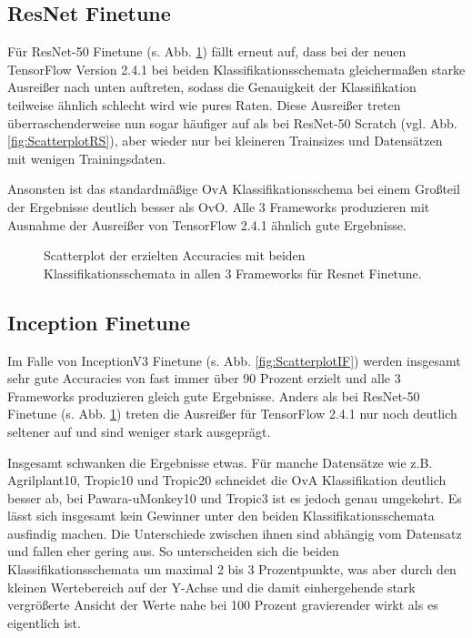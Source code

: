 \subsection{ResNet Finetune}
Für ResNet-50 Finetune (s. Abb. \ref{fig:ScatterplotRF}) fällt erneut auf, dass bei der neuen TensorFlow \cite{tensorflow} Version 2.4.1 bei beiden Klassifikationsschemata gleichermaßen starke Ausreißer nach unten auftreten, sodass die Genauigkeit der Klassifikation teilweise ähnlich schlecht wird wie pures Raten. Diese Ausreißer treten überraschenderweise nun sogar häufiger auf als bei ResNet-50 Scratch (vgl. Abb. \ref{fig:ScatterplotRS}), aber wieder nur bei kleineren Trainsizes und Datensätzen mit wenigen Trainingsdaten.

Ansonsten ist das standardmäßige OvA Klassifikationsschema bei einem Großteil der Ergebnisse deutlich besser als OvO. Alle 3 Frameworks produzieren mit Ausnahme der Ausreißer von TensorFlow \cite{tensorflow} 2.4.1 ähnlich gute Ergebnisse.
\begin{figure}[H]
\begin{adjustbox}{width=\textwidth, center}

\end{adjustbox}
\caption{Scatterplot der erzielten Accuracies mit beiden Klassifikationsschemata in allen 3 Frameworks für Resnet Finetune.}
\label{fig:ScatterplotRF}
\end{figure}
\newpage
\subsection{Inception Finetune}
Im Falle von InceptionV3 Finetune (s. Abb. \ref{fig:ScatterplotIF}) werden insgesamt sehr gute Accuracies von fast immer über 90 Prozent erzielt und alle 3 Frameworks produzieren gleich gute Ergebnisse. Anders als bei ResNet-50 Finetune (s. Abb. \ref{fig:ScatterplotRF}) treten die Ausreißer für TensorFlow \cite{tensorflow} 2.4.1 nur noch deutlich seltener auf und sind weniger stark ausgeprägt.

Insgesamt schwanken die Ergebnisse etwas. Für manche Datensätze wie z.B. Agrilplant10, Tropic10 und Tropic20 schneidet die OvA Klassifikation deutlich besser ab, bei Pawara-uMonkey10 und Tropic3 ist es jedoch genau umgekehrt.
Es lässt sich insgesamt kein Gewinner unter den beiden Klassifikationsschemata ausfindig machen. Die Unterschiede zwischen ihnen sind abhängig vom Datensatz und fallen eher gering aus. So unterscheiden sich die beiden Klassifikationsschemata um maximal 2 bis 3 Prozentpunkte, was aber durch den kleinen Wertebereich auf der Y-Achse und die damit einhergehende stark vergrößerte Ansicht der Werte nahe bei 100 Prozent gravierender wirkt als es eigentlich ist.

